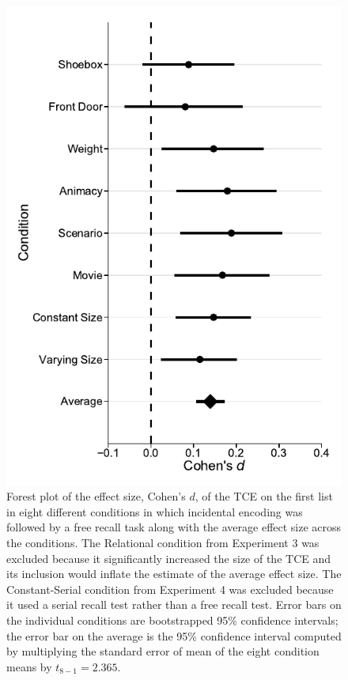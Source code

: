 \documentclass[man,natbib,floatsintext]{apa6} %
\begin{document}
\begin{figure}%
\includegraphics{figures/meta.pdf}
\caption{Forest plot of the effect size, Cohen's $d$, of the TCE on the first list in eight different conditions in which incidental encoding was followed by a free recall task along with the average effect size across the conditions. The Relational condition from Experiment 3 was excluded because it significantly increased the size of the TCE and its inclusion would inflate the estimate of the average effect size. The Constant-Serial condition from Experiment 4 was excluded because it used a serial recall test rather than a free recall test. Error bars on the individual conditions are bootstrapped 95\% confidence intervals; the error bar on the average is the 95\% confidence interval computed by multiplying the standard error of mean of the eight condition means by $t_{8-1}=2.365$.}
\label{meta}
\end{figure}
\end{document}
